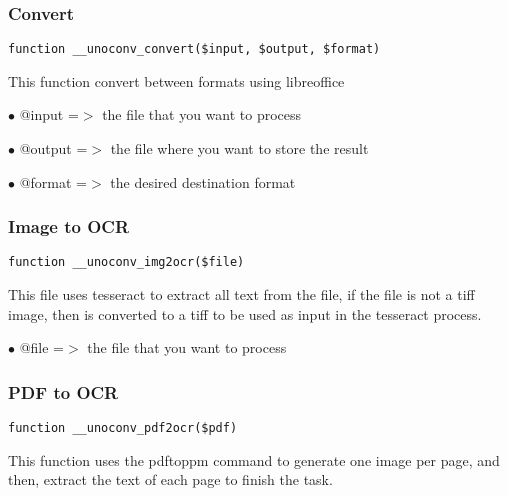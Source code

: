 \documentclass[a4paper]{article}
\begin{document}
\hypertarget{toc537}{}
\subsubsection{Convert}

\begin{lstlisting}
function __unoconv_convert($input, $output, $format)
\end{lstlisting}

This function convert between formats using libreoffice

\begin{compactitem}
\item[\color{myblue}$\bullet$] @input  =$>$ the file that you want to process
\item[\color{myblue}$\bullet$] @output =$>$ the file where you want to store the result
\item[\color{myblue}$\bullet$] @format =$>$ the desired destination format
\end{compactitem}

\hypertarget{toc538}{}
\subsubsection{Image to OCR}

\begin{lstlisting}
function __unoconv_img2ocr($file)
\end{lstlisting}

This file uses tesseract to extract all text from the file, if the file
is not a tiff image, then is converted to a tiff to be used as input in
the tesseract process.

\begin{compactitem}
\item[\color{myblue}$\bullet$] @file =$>$ the file that you want to process
\end{compactitem}

\hypertarget{toc539}{}
\subsubsection{PDF to OCR}

\begin{lstlisting}
function __unoconv_pdf2ocr($pdf)
\end{lstlisting}

This function uses the pdftoppm command to generate one image per page,
and then, extract the text of each page to finish the task.
\end{document}
